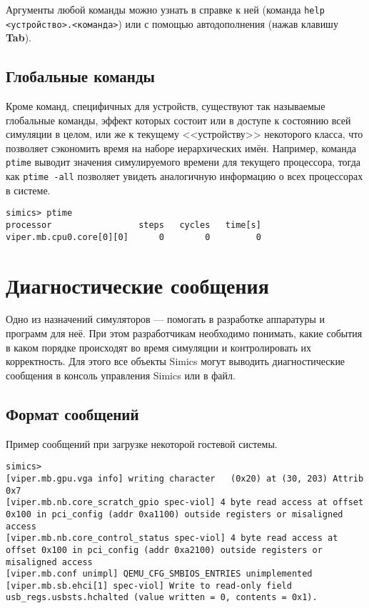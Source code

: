 Аргументы любой команды можно узнать в справке к ней (команда \texttt{help <устройство>.<команда>}) или с помощью автодополнения (нажав клавишу \textbf{Tab}).

\subsection{Глобальные команды}

Кроме команд, специфичных для устройств, существуют так называемые глобальные команды, эффект которых состоит или в доступе к состоянию всей симуляции в целом, или же к текущему <<устройству>> некоторого класса, что позволяет сэкономить время на наборе иерархических имён. Например, команда \texttt{ptime} выводит значения симулируемого времени для текущего процессора, тогда как \texttt{ptime -all} позволяет увидеть аналогичную информацию о всех процессорах в системе.

\begin{lstlisting}
simics> ptime
processor                 steps   cycles   time[s]
viper.mb.cpu0.core[0][0]      0        0         0
\end{lstlisting}


\section{Диагностические сообщения}

Одно из назначений симуляторов --- помогать в разработке аппаратуры и программ для неё. При этом разработчикам необходимо понимать, какие события в каком порядке происходят во время симуляции и контролировать их корректность. Для этого все объекты Simics могут выводить диагностические сообщения в консоль управления Simics или в файл.


\subsection{Формат сообщений}
Пример сообщений при загрузке некоторой гостевой системы.

\begin{lstlisting}
simics>
[viper.mb.gpu.vga info] writing character   (0x20) at (30, 203) Attrib 0x7
[viper.mb.nb.core_scratch_gpio spec-viol] 4 byte read access at offset 0x100 in pci_config (addr 0xa1100) outside registers or misaligned access
[viper.mb.nb.core_control_status spec-viol] 4 byte read access at offset 0x100 in pci_config (addr 0xa2100) outside registers or misaligned access
[viper.mb.conf unimpl] QEMU_CFG_SMBIOS_ENTRIES unimplemented
[viper.mb.sb.ehci[1] spec-viol] Write to read-only field usb_regs.usbsts.hchalted (value written = 0, contents = 0x1).
\end{lstlisting}

